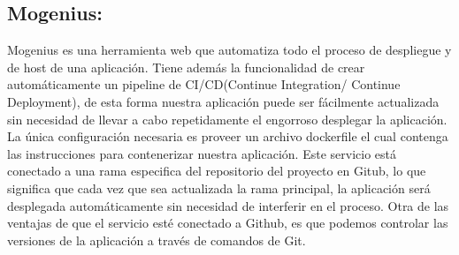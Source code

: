 \subsection{Mogenius:}

Mogenius es una herramienta web que automatiza todo el proceso de despliegue y de host de una aplicación. Tiene además la funcionalidad de crear automáticamente un pipeline de CI/CD(Continue Integration/ Continue Deployment), de esta forma nuestra aplicación puede ser fácilmente actualizada sin necesidad de llevar a cabo repetidamente el engorroso desplegar la aplicación. La única configuración necesaria es proveer un archivo dockerfile el cual contenga las instrucciones para contenerizar nuestra aplicación. Este servicio está conectado a una rama especifica del repositorio del proyecto en Gitub, lo que significa que cada vez que sea actualizada la rama principal, la aplicación será desplegada automáticamente sin necesidad de interferir en el proceso. Otra de las ventajas de que el servicio esté conectado a Github, es que podemos controlar las versiones de la aplicación a través de comandos de Git.